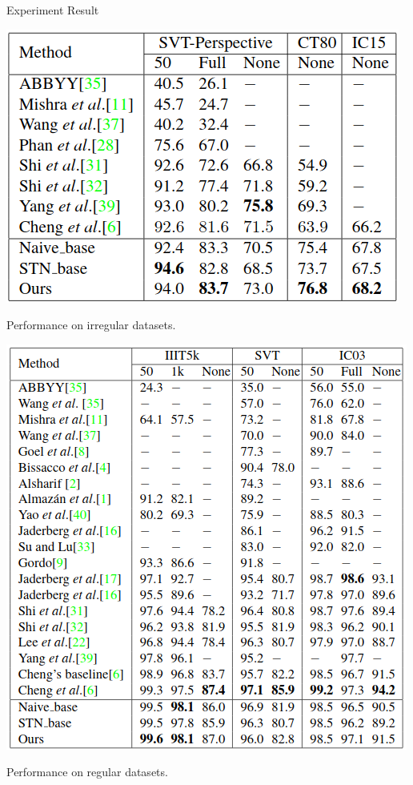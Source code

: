 \documentclass[compress]{beamer}
\begin{document}
\begin{frame}[allowframebreaks]{Experiment Result}
    \begin{table}
        \includegraphics[height=.5\textheight]{pfirregular}
        \caption{Performance on irregular datasets.}
    \end{table}
    \begin{table}
        \includegraphics[height=.75\textheight]{pfregular}
        \caption{Performance on regular datasets.}
    \end{table}
\end{frame}
\end{document}
